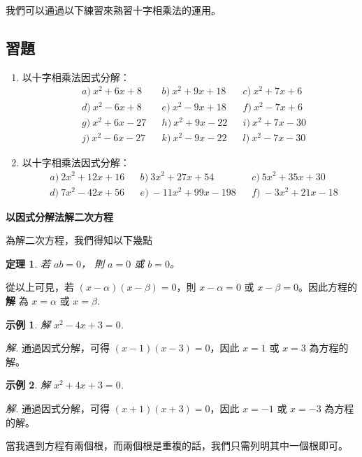 \documentclass[12pt]{article}
\newtheorem*{theorem}{定理}
\newtheorem{example}{示例}
\begin{document}
    我們可以通過以下練習來熟習十字相乘法的運用。

    \subsection*{習題}
    \begin{enumerate}
        \item 以十字相乘法因式分解：\begin{align*}
            &a)\ x^2+6x+8&&b)\ x^2+9x+18&&c)\ x^2+7x+6\\
            &d)\ x^2-6x+8&&e)\ x^2-9x+18&&f)\ x^2-7x+6\\
            &g)\ x^2+6x-27&&h)\ x^2+9x-22&&i)\ x^2+7x-30\\
            &j)\ x^2-6x-27&&k)\ x^2-9x-22&&l)\ x^2-7x-30
        \end{align*}
        \item 以十字相乘法因式分解：\begin{align*}
            &a)\ 2x^2+12x+16&&b)\ 3x^2+27x+54&&c)\ 5x^2+35x+30\\
            &d)\ 7x^2-42x+56&&e)\ -11x^2+99x-198&&f)\ -3x^2+21x-18
        \end{align*}
    \end{enumerate}

    \begin{center}
        \textbf{以因式分解法解二次方程}
    \end{center}

    為解二次方程，我們得知以下幾點\begin{theorem}
        若 $ab=0$， 則 $a=0$ 或 $b=0$。
    \end{theorem}

    從以上可見，若 $(x-\alpha)(x-\beta)=0$，則 $x-\alpha=0$ 或 $x-\beta=0$。因此方程的 \textbf{解} 為 $x=\alpha$ 或 $x=\beta$.

    \begin{example}
        解 $x^2-4x+3=0$.
    \end{example}

    \textit{ 解. }通過因式分解，可得 $(x-1)(x-3)=0$，因此 $x=1$ 或 $x=3$ 為方程的解。

    \begin{example}
        解 $x^2+4x+3=0$.
    \end{example}

    \textit{ 解. }通過因式分解，可得 $(x+1)(x+3)=0$，因此 $x=-1$ 或 $x=-3$ 為方程的解。

    當我遇到方程有兩個根，而兩個根是重複的話，我們只需列明其中一個根即可。
\end{document}
